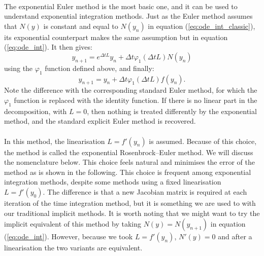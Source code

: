       \paragraph{}
      The exponential Euler method is the most basic one, and it can be used to understand exponential integration methods.
      Just as the Euler method assumes that $N\left(y\right)$ is constant and equal to $N\left(y_n\right)$ in equation (\ref{eq:ode_int_classic}), its exponential counterpart makes the same assumption but in equation (\ref{eq:ode_int}).
      It then gives:
      \begin{equation}
        y_{n+1} = e^{\Delta t L} y_n + \Delta t \varphi_1\left(\Delta t L\right) N\left(y_n\right)
      \end{equation}
      using the $\varphi_1$ function defined above, and finally:
      \begin{equation}\label{eq:expeuler}
        y_{n+1} = y_n + \Delta t \varphi_1\left(\Delta t L\right) f\left(y_n\right) .
      \end{equation}
      Note the difference with the corresponding standard Euler method, for which the $\varphi_1$ function is replaced with the identity function.
      If there is no linear part in the decomposition, with $L = 0$, then nothing is treated differently by the exponential method, and the standard explicit Euler method is recovered.

      \paragraph{}
      In this method, the linearisation $L = f'\left(y_n\right)$ is assumed.
      Because of this choice, the method is called the exponential Rosenbrock--Euler method.
      We will discuss the nomenclature below.
      This choice feels natural and minimises the error of the method as is shown in the following.
      This choice is frequent among exponential integration methods, despite some methods using a fixed linearisation $L = f'\left(y_0\right)$.
      The difference is that a new Jacobian matrix is required at each iteration of the time integration method, but it is something we are used to with our traditional implicit methods.
      It is worth noting that we might want to try the implicit equivalent of this method by taking $N\left(y\right) = N\left(y_{n+1}\right)$ in equation (\ref{eq:ode_int}).
      However, because we took $L = f'\left(y_n\right)$, $N'\left(y\right) = 0$ and after a linearisation the two variants are equivalent.


